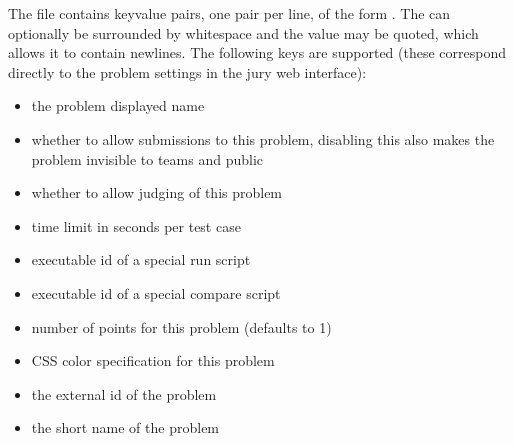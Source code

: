\documentclass[a4paper,10pt,english,openany]{sphinxmanual}
\begin{document}
\sphinxAtStartPar
The file  contains key\sphinxhyphen{}value pairs, one
pair per line, of the form . The \sphinxcode{\sphinxupquote{=}} can
optionally be surrounded by whitespace and the value may be quoted,
which allows it to contain newlines. The following keys are supported
(these correspond directly to the problem settings in the jury web
interface):
\begin{itemize}
\item {} 
\sphinxAtStartPar
{} \sphinxhyphen{} the problem displayed name

\item {} 
\sphinxAtStartPar
{} \sphinxhyphen{} whether to allow submissions to this problem,
disabling this also makes the problem invisible to teams and public

\item {} 
\sphinxAtStartPar
{} \sphinxhyphen{} whether to allow judging of this problem

\item {} 
\sphinxAtStartPar
{} \sphinxhyphen{} time limit in seconds per test case

\item {} 
\sphinxAtStartPar
{} \sphinxhyphen{} executable id of a special run script

\item {} 
\sphinxAtStartPar
{} \sphinxhyphen{} executable id of a special compare script

\item {} 
\sphinxAtStartPar
{} \sphinxhyphen{} number of points for this problem (defaults to 1)

\item {} 
\sphinxAtStartPar
{} \sphinxhyphen{} CSS color specification for this problem

\item {} 
\sphinxAtStartPar
{} \sphinxhyphen{} the external id of the problem

\item {} 
\sphinxAtStartPar
{} \sphinxhyphen{} the short name of the problem

\end{itemize}
\end{document}
